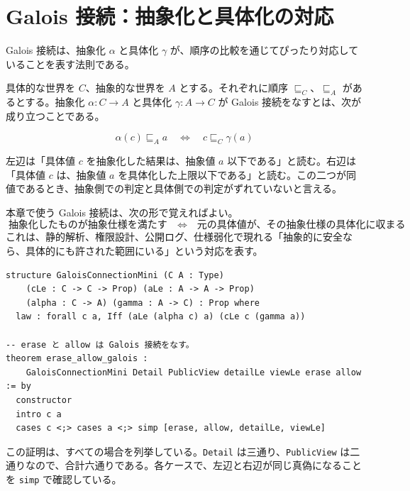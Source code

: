 
\section{Galois 接続：抽象化と具体化の対応}

Galois 接続は、抽象化 \(\alpha\) と具体化 \(\gamma\) が、順序の比較を通じてぴったり対応していることを表す法則である。

具体的な世界を \(C\)、抽象的な世界を \(A\) とする。それぞれに順序 \(\sqsubseteq_C\)、\(\sqsubseteq_A\) があるとする。抽象化 \(\alpha : C \to A\) と具体化 \(\gamma : A \to C\) が Galois 接続をなすとは、次が成り立つことである。

\[
  \alpha(c) \sqsubseteq_A a
  \quad\Longleftrightarrow\quad
  c \sqsubseteq_C \gamma(a)
\]

左辺は「具体値 \(c\) を抽象化した結果は、抽象値 \(a\) 以下である」と読む。右辺は「具体値 \(c\) は、抽象値 \(a\) を具体化した上限以下である」と読む。この二つが同値であるとき、抽象側での判定と具体側での判定がずれていないと言える。

\begin{definitionbox}
本章で使う Galois 接続は、次の形で覚えればよい。
\[
  \text{抽象化したものが抽象仕様を満たす}
  \quad\Longleftrightarrow\quad
  \text{元の具体値が、その抽象仕様の具体化に収まる}
\]
これは、静的解析、権限設計、公開ログ、仕様弱化で現れる「抽象的に安全なら、具体的にも許された範囲にいる」という対応を表す。
\end{definitionbox}

\begin{listing}[htbp]
\begin{verbatim}
structure GaloisConnectionMini (C A : Type)
    (cLe : C -> C -> Prop) (aLe : A -> A -> Prop)
    (alpha : C -> A) (gamma : A -> C) : Prop where
  law : forall c a, Iff (aLe (alpha c) a) (cLe c (gamma a))

-- erase と allow は Galois 接続をなす。
theorem erase_allow_galois :
    GaloisConnectionMini Detail PublicView detailLe viewLe erase allow := by
  constructor
  intro c a
  cases c <;> cases a <;> simp [erase, allow, detailLe, viewLe]
\end{verbatim}
\caption{Galois接続の最小定義}
\label{lst:ch16-galois-def}
\end{listing}

この証明は、すべての場合を列挙している。\texttt{Detail} は三通り、\texttt{PublicView} は二通りなので、合計六通りである。各ケースで、左辺と右辺が同じ真偽になることを \texttt{simp} で確認している。

